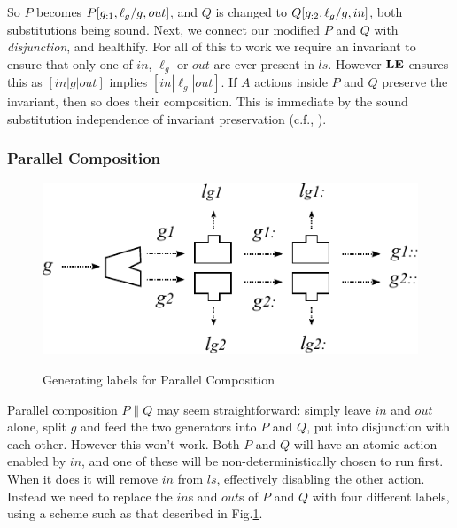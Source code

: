 So $P$ becomes $P[g_{:1},\ell_g/g,out]$,
and $Q$ is changed to $Q[g_{:2},\ell_g/g,in]$, both substitutions being sound.
Next, we connect our modified $P$ and $Q$ with \emph{disjunction},
and healthify.
For all of this to work we require an invariant
to ensure that only one of $in$, $\ell_g$ or $out$
are ever present in $ls$.
However $\mathbf{LE}$ ensures this as $[in|g|out]$ implies $[in|\ell_g|out]$.
If $A$ actions inside $P$ and $Q$ preserve the invariant,
then so does their composition.
This is immediate by the sound substitution independence
of invariant preservation (c.f., ).



\newpage
\subsubsection{Parallel Composition}

\begin{figure}[h]
  \centering
  \includegraphics{images/parallel-label-gen}\\
  \caption{Generating labels for Parallel Composition}
  \label{fig:par-lbl-gen}
\end{figure}
Parallel composition $P\parallel Q$ may seem straightforward:
simply leave $in$ and $out$ alone, split $g$ and feed the
two generators into $P$ and $Q$, put into disjunction with each other.
However this won't work. Both $P$ and $Q$ will
have an atomic action enabled by $in$,
and one of these will be non-deterministically chosen to run first.
When it does it will remove $in$ from $ls$,
effectively disabling the other action.
Instead we need to replace the $in$s and $out$s of $P$ and $Q$
with four different labels, using a scheme such as that described
in Fig.\ref{fig:par-lbl-gen}.

